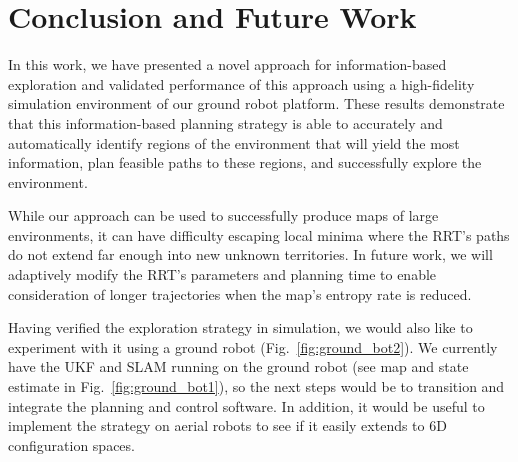 \section{Conclusion and Future Work}
\label{sec:conclusion}

In this work, we have presented a novel approach for information-based exploration and validated performance of this approach using a high-fidelity simulation environment of our ground robot platform. These results demonstrate that this information-based planning strategy is able to accurately and automatically identify regions of the environment that will yield the most information, plan feasible paths to these regions, and successfully explore the environment.

While our approach can be used to successfully produce maps of large environments, it can have difficulty escaping local minima where the RRT's paths do not extend far enough into new unknown territories. In future work, we will adaptively modify the RRT's parameters and planning time to enable consideration of longer trajectories when the map's entropy rate is reduced.

Having verified the exploration strategy in simulation, we would also like to experiment with it using a ground robot (Fig.~\ref{fig:ground_bot2}). We currently have the UKF and SLAM running on the ground robot (see map and state estimate in Fig.~\ref{fig:ground_bot1}), so the next steps would be to transition and integrate the planning and control software. In addition, it would be useful to implement the strategy on aerial robots to see if it easily extends to 6D configuration spaces. 

